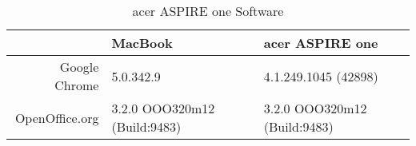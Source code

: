   \begin{table}
    \begin{center}
    \begin{tabular}{| r | p{5cm} | p{5cm} |}
      \hline
                                   & MacBook                      & acer ASPIRE one              \\ \hline
      Google Chrome                & 5.0.342.9                    & 4.1.249.1045 (42898)         \\ \hline
      OpenOffice.org               & 3.2.0 OOO320m12 (Build:9483) & 3.2.0 OOO320m12 (Build:9483) \\
      \hline
    \end{tabular}
    \caption{acer ASPIRE one Software}
    \label{table:softwareSpecs}
    \end{center}
  \end{table}
